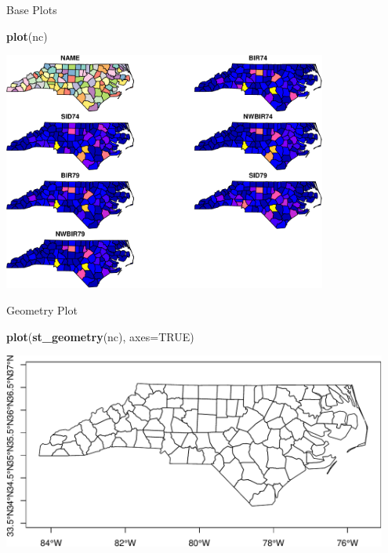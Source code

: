 \documentclass[11pt,ignorenonframetext,]{beamer}
\newenvironment{Shaded}{}{}
\newcommand{\KeywordTok}[1]{\textcolor[rgb]{0.00,0.44,0.13}{\textbf{#1}}}
\newcommand{\DataTypeTok}[1]{\textcolor[rgb]{0.56,0.13,0.00}{#1}}
\newcommand{\OtherTok}[1]{\textcolor[rgb]{0.00,0.44,0.13}{#1}}
\newcommand{\NormalTok}[1]{#1}
\let\oldShaded\Shaded
\let\endoldShaded\endShaded
\renewenvironment{Shaded}{\footnotesize\begin{spacing}{0.9}\oldShaded}{\endoldShaded\end{spacing}}
\let\oldverbatim\verbatim
\let\endoldverbatim\endverbatim
\newcommand{\scriptoutput}{
  \renewenvironment{Shaded}{\scriptsize\begin{spacing}{0.9}\oldShaded}{\endoldShaded\end{spacing}}
  \renewenvironment{verbatim}{\scriptsize\begin{spacing}{0.9}\oldverbatim}{\endoldverbatim\end{spacing}}
}
\begin{document}
\begin{frame}[fragile,t]{Base Plots}

\scriptoutput

\begin{Shaded}
\begin{Highlighting}[]
\KeywordTok{plot}\NormalTok{(nc)}
\end{Highlighting}
\end{Shaded}

\begin{center}\includegraphics[width=0.8\textwidth]{Lec17_files/figure-beamer/unnamed-chunk-2-1} \end{center}

\end{frame}

\begin{frame}[fragile,t]{Geometry Plot}

\scriptoutput

\begin{Shaded}
\begin{Highlighting}[]
\KeywordTok{plot}\NormalTok{(}\KeywordTok{st_geometry}\NormalTok{(nc), }\DataTypeTok{axes=}\OtherTok{TRUE}\NormalTok{)}
\end{Highlighting}
\end{Shaded}

\begin{center}\includegraphics[width=0.95\textwidth]{Lec17_files/figure-beamer/unnamed-chunk-3-1} \end{center}

\end{frame}
\end{document}
